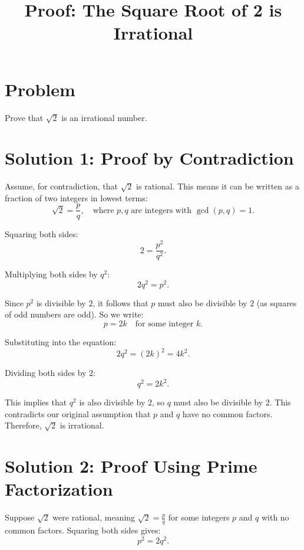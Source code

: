 \documentclass{article}
\begin{document}
\title{Proof: The Square Root of 2 is Irrational}
\author{}
\date{}
\maketitle

\section*{Problem}
Prove that $\sqrt{2}$ is an irrational number.

\section*{Solution 1: Proof by Contradiction}
Assume, for contradiction, that $\sqrt{2}$ is rational. This means it can be written as a fraction of two integers in lowest terms:
\begin{equation}
    \sqrt{2} = \frac{p}{q}, \quad \text{where } p, q \text{ are integers with } \gcd(p, q) = 1.
\end{equation}

Squaring both sides:
\begin{equation}
    2 = \frac{p^2}{q^2}.
\end{equation}

Multiplying both sides by $q^2$:
\begin{equation}
    2q^2 = p^2.
\end{equation}

Since $p^2$ is divisible by $2$, it follows that $p$ must also be divisible by $2$ (as squares of odd numbers are odd). So we write:
\begin{equation}
    p = 2k \quad \text{for some integer } k.
\end{equation}

Substituting into the equation:
\begin{equation}
    2q^2 = (2k)^2 = 4k^2.
\end{equation}

Dividing both sides by $2$:
\begin{equation}
    q^2 = 2k^2.
\end{equation}

This implies that $q^2$ is also divisible by $2$, so $q$ must also be divisible by $2$. This contradicts our original assumption that $p$ and $q$ have no common factors. Therefore, $\sqrt{2}$ is irrational.

\section*{Solution 2: Proof Using Prime Factorization}
Suppose $\sqrt{2}$ were rational, meaning $\sqrt{2} = \frac{p}{q}$ for some integers $p$ and $q$ with no common factors. Squaring both sides gives:
\begin{equation}
    p^2 = 2q^2.
\end{equation}
\end{document}
